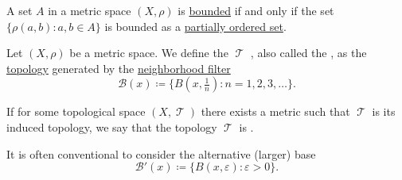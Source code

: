 \begin{proposition}\label{rem:bounded_set_metric_order_equivalence}
  A set \( A \) in a metric space \( (X, \rho) \) is \hyperref[def:metric_space/bounded_set]{bounded} if and only if the set \( \{ \rho(a, b) \colon a, b \in A \} \) is bounded as a \hyperref[def:extremal_points/bounds]{partially ordered set}.
\end{proposition}

\begin{definition}\label{def:metric_topology}
  Let \( (X, \rho) \) be a metric space. We define the \( \mscrT \) , also called the , as the \hyperref[def:topological_space]{topology} generated by the \hyperref[def:topological_local_base]{neighborhood filter}
  \begin{equation}\label{def:metric_topology/integer_base}
    \mathcal{B}(x) \coloneqq \{ B(x, \tfrac 1 n) \colon n = 1, 2, 3, \ldots \}.
  \end{equation}

  If for some topological space \( (X, \mscrT) \) there exists a metric such that \( \mscrT \) is its induced topology, we say that the topology \( \mscrT \) is .

  It is often conventional to consider the alternative (larger) base
  \begin{equation}\label{def:metric_topology/real_base}
    \mathcal{B}'(x) \coloneqq \{ B(x, \varepsilon) \colon \varepsilon > 0 \}.
  \end{equation}
\end{definition}
